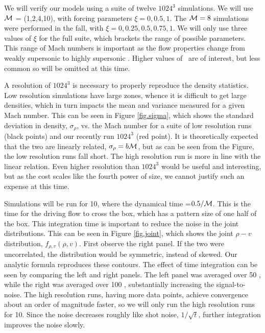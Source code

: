 We will verify our models using a suite of twelve $1024^3$ simulations.  We will use
$\mathcal{M}$ = (1,2,4,10), with forcing parameters $\xi=0,0.5,1$.  The $\mathcal{M}=8$
simulations were performed in the fall, with $\xi=0,0.25,0.5,0.75,1$.  We will
only use three values of $\xi$ for the full suite, which brackets the range of
possible parameters.  This range of Mach numbers is important as the flow
properties change from weakly supersonic  to highly supersonic .
Higher values of \mach\ are of interest, but less common so will be omitted at
this time.

A resolution of $1024^3$ is necessary to properly reproduce the density
statistics.  Low resolution simulations have large zones, whence it is difficult
to get large densities, which in turn impacts the mean and variance measured
for a given Mach number.  This can be seen in Figure \ref{fig.sigma}, which
shows the standard deviation in density, $\sigma_\rho$, vs. the Mach number for
a suite of low resolution runs (black points) and our recently run $1024^3$ (red
point).  It
is theoretically expected that the two are linearly related, $\sigma_\rho = b
\mathcal{M}$, but as can be seen from the Figure, the low resolution runs fall short.
The high resolution run is more in line with the linear relation.  Even higher 
resolution than $1024^3$ would be useful and interesting, but as the cost scales like the
fourth power of size, we cannot justify such an expense at this time.

Simulations will be run for 10\tdyn, where the dynamical time \tdyn=$0.5/\mathcal{M}$.
This is the time for the driving flow to cross the box, which has a pattern size
of one half of the box.  This integration time is important to reduce the noise
in the joint distributions.  This can be seen in Figure \ref{fig.joint}, which
shows the joint $\rho-v$ distribution, $f_{\rho,v}(\rho,v)$.  First observe the right panel.  If the
two were uncorrelated, the distribution would be symmetric, instead of skewed.
Our analytic formula reproduces these contours.  The effect of time integration
can be seen by comparing the left and right panels.  The left panel was averaged
over 50 \tdyn, while the right was averaged over 100 \tdyn, substantially
increasing the signal-to-noise.  The high resolution runs, having more data
points, achieve convergence about an order of magnitude faster, so we will only
run the high resolution runs for 10\tdyn.  Since the noise decreases roughly
like shot noise, $1/\sqrt{t}$, further integration improves the noise slowly.


